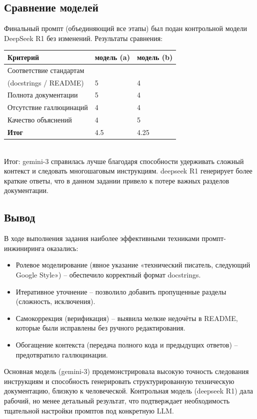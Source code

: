 \subsection{Сравнение моделей}
Финальный промпт (объединяющий все этапы) был подан контрольной модели DeepSeek R1 без изменений.
Результаты сравнения:
\begin{table}[h!]
	\centering
	\begin{tabular}{|l|p{5cm}|p{5cm}|}
		\hline
		\textbf{Критерий} & \textbf{модель (a)} & \textbf{модель (b)} \\
		\hline
		Соответствие стандартам  \\ (docstrings / README) & 5 & 4 \\
		\hline
		Полнота документации  & 5 & 4\\
		\hline
		Отсутствие галлюцинаций & 4 & 4 \\
		\hline
		Качество объяснений & 4 & 5 \\
		\hline
		\textbf{Итог} & 4.5 & 4.25\\
		\hline
	\end{tabular}
\end{table} \\
Итог: gemini-3 справилась лучше благодаря способности удерживать сложный контекст и следовать многошаговым инструкциям. deepseek R1 генерирует более краткие ответы, что в данном задании привело к потере важных разделов документации.
\newpage
\subsection{Вывод}
В ходе выполнения задания наиболее эффективными техниками промпт-инжиниринга оказались:
\begin{itemize}
	\item Ролевое моделирование (явное указание «технический писатель, следующий Google Style») – обеспечило корректный формат docstrings.
	\item Итеративное уточнение – позволило добавить пропущенные разделы (сложность, исключения).
	\item Самокоррекция (верификация) – выявила мелкие недочёты в README, которые были исправлены без ручного редактирования.
	\item Обогащение контекста (передача полного кода и предыдущих ответов) – предотвратило галлюцинации.
\end{itemize}
Основная модель (gemini-3) продемонстрировала высокую точность следования инструкциям и способность генерировать структурированную техническую документацию, близкую к человеческой. Контрольная модель (deepseek R1) дала рабочий, но менее детальный результат, что подтверждает необходимость тщательной настройки промптов под конкретную LLM.